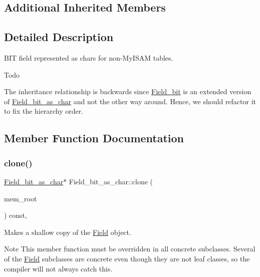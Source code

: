 \subsection*{Additional Inherited Members}


\subsection{Detailed Description}
B\+IT field represented as chars for non-\/My\+I\+S\+AM tables.

\begin{DoxyRefDesc}{Todo}
\item[\mbox{\hyperlink{todo__todo000013}{Todo}}]The inheritance relationship is backwards since \mbox{\hyperlink{classField__bit}{Field\+\_\+bit}} is an extended version of \mbox{\hyperlink{classField__bit__as__char}{Field\+\_\+bit\+\_\+as\+\_\+char}} and not the other way around. Hence, we should refactor it to fix the hierarchy order. \end{DoxyRefDesc}


\subsection{Member Function Documentation}
\mbox{\label{classField__bit__as__char_ad4db0c25fbc5074baf6793daabfe5447}} 
\subsubsection{\texorpdfstring{clone()}{clone()}\hspace{0.1cm}{\footnotesize\ttfamily [1/2]}}
{\footnotesize\ttfamily \mbox{\hyperlink{classField__bit__as__char}{Field\+\_\+bit\+\_\+as\+\_\+char}}$\ast$ Field\+\_\+bit\+\_\+as\+\_\+char\+::clone (\begin{DoxyParamCaption}\item[{M\+E\+M\+\_\+\+R\+O\+OT $\ast$}]{mem\+\_\+root }\end{DoxyParamCaption}) const\hspace{0.3cm}{\ttfamily [inline]}, {\ttfamily [virtual]}}

Makes a shallow copy of the \mbox{\hyperlink{classField}{Field}} object.

\begin{DoxyNote}{Note}
This member function must be overridden in all concrete subclasses. Several of the \mbox{\hyperlink{classField}{Field}} subclasses are concrete even though they are not leaf classes, so the compiler will not always catch this.
\end{DoxyNote}

